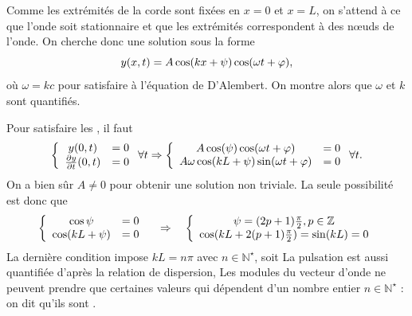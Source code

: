 \documentclass[12pt,fancy]{cours}
\begin{document}

Comme les extrémités de la corde sont fixées en $x=0$ et $x=L$, on s'attend à ce que l'onde soit stationnaire et que les extrémités correspondent à des nœuds de l'onde.
On cherche donc une solution sous la forme
\begin{equation}
  y(x,t)=A\cos(kx+\psi)\cos(\omega t+\varphi),
\end{equation}
où $\omega = k c$ pour satisfaire à l'équation de D'Alembert. On montre alors que $\omega$ et $k$ sont quantifiés.

\begin{demo}
Pour satisfaire les , il faut
\begin{equation}
  \left\{\begin{array}{cc}
y(0,t) & = 0\\
\frac{\partial{y}}{\partial{t}}(0,t) & = 0
\end{array}\right. \forall t
\Rightarrow
\left\{\begin{array}{cc}
A \cos(\psi)\cos(\omega t + \varphi) & = 0\\
A \omega \cos(kL + \psi)\sin(\omega t + \varphi) & = 0
\end{array}\right. \forall t.
\end{equation}
On a bien sûr $A \neq 0$ pour obtenir une solution non triviale. La seule possibilité est donc que
\begin{equation}
  \left\{
    \begin{array}{cc}
    \cos \psi & = 0 \\ 
    \cos(k L + \psi) & = 0\\ 
    \end{array}
  \right. 
  \quad \Rightarrow \quad
  \left\{
    \begin{array}{cc}
    \psi=(2p+1)\frac{\pi}{2},  p\in\mathbb{Z} \\ 
    \cos(kL+2(p+1)\frac{\pi}{2}) =\sin(kL)  = 0\\ 
    \end{array}
  \right. 
\end{equation}
La dernière condition impose $kL=n\pi$ avec $n\in\mathbb{N}^{\star}$, soit 
La pulsation est aussi quantifiée d’après la relation de dispersion, 
Les modules du vecteur d'onde ne peuvent prendre que certaines valeurs qui dépendent d'un nombre entier $n\in\mathbb{N}^{\star}$
: on dit qu'ils sont . 
\end{demo}
\end{document}
